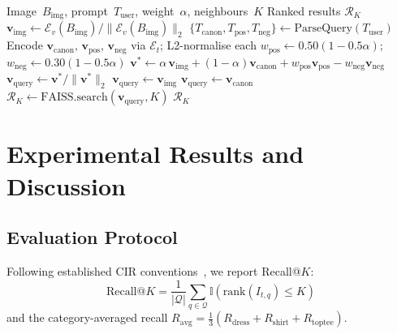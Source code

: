 \documentclass[conference]{IEEEtran}
\begin{document}
\begin{algorithm}[!t]
\caption{CADS: End-to-End Query Encoding}
\label{alg:cads}
\begin{algorithmic}[1]
\REQUIRE Image~$B_{\text{img}}$, prompt~$T_{\text{user}}$, weight~$\alpha$, neighbours~$K$
\ENSURE Ranked results $\mathcal{R}_K$
    \STATE $\mathbf{v}_{\text{img}} \leftarrow \mathcal{E}_v(B_{\text{img}}) / \|\mathcal{E}_v(B_{\text{img}})\|_2$
\ENDIF
{}
    \STATE $\{T_{\text{canon}}, T_{\text{pos}}, T_{\text{neg}}\} \leftarrow \text{ParseQuery}(T_{\text{user}})$
    \STATE Encode $\mathbf{v}_{\text{canon}},\,\mathbf{v}_{\text{pos}},\,\mathbf{v}_{\text{neg}}$ via $\mathcal{E}_t$; L2-normalise each
\ENDIF
{}
    \STATE $w_{\text{pos}} \leftarrow 0.50(1 - 0.5\alpha)$;\quad $w_{\text{neg}} \leftarrow 0.30(1 - 0.5\alpha)$
    \STATE $\mathbf{v}^{*} \leftarrow \alpha\,\mathbf{v}_{\text{img}} {+} (1{-}\alpha)\mathbf{v}_{\text{canon}} {+} w_{\text{pos}}\mathbf{v}_{\text{pos}} {-} w_{\text{neg}}\mathbf{v}_{\text{neg}}$
    \STATE $\mathbf{v}_{\text{query}} \leftarrow \mathbf{v}^{*} / \|\mathbf{v}^{*}\|_2$
    \STATE $\mathbf{v}_{\text{query}} \leftarrow \mathbf{v}_{\text{img}}$
\ELSE
    \STATE $\mathbf{v}_{\text{query}} \leftarrow \mathbf{v}_{\text{canon}}$
\ENDIF
\STATE $\mathcal{R}_K \leftarrow \text{FAISS}.\text{search}(\mathbf{v}_{\text{query}}, K)$
\RETURN $\mathcal{R}_K$
\end{algorithmic}
\end{algorithm}

\section{Experimental Results and Discussion}

\subsection{Evaluation Protocol}
Following established CIR conventions~\cite{baldrati2022clip4cir, wu2021fashioniq}, we report Recall@$K$:
\begin{equation}
\text{Recall@}K = \frac{1}{|\mathcal{Q}|} \sum_{q \in \mathcal{Q}} \mathbb{I}\!\left(\text{rank}(I_{t,q}) \le K\right)
\end{equation}
and the category-averaged recall $R_{\text{avg}} = \tfrac{1}{3}(R_{\text{dress}} + R_{\text{shirt}} + R_{\text{toptee}})$.
\end{document}
